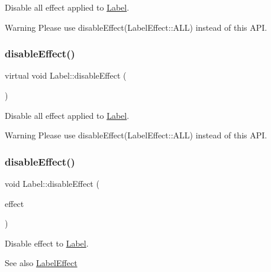Disable all effect applied to \hyperlink{classLabel}{Label}. \begin{DoxyWarning}{Warning}
Please use disable\+Effect(\+Label\+Effect\+::\+A\+L\+L) instead of this A\+PI. 
\end{DoxyWarning}
\mbox{\label{classLabel_a9991f8f752452ac697b1935d1be47c9f}} 
\subsubsection{\texorpdfstring{disable\+Effect()}{disableEffect()}\hspace{0.1cm}{\footnotesize\ttfamily [2/4]}}
{\footnotesize\ttfamily virtual void Label\+::disable\+Effect (\begin{DoxyParamCaption}{ }\end{DoxyParamCaption})\hspace{0.3cm}{\ttfamily [virtual]}}

Disable all effect applied to \hyperlink{classLabel}{Label}. \begin{DoxyWarning}{Warning}
Please use disable\+Effect(\+Label\+Effect\+::\+A\+L\+L) instead of this A\+PI. 
\end{DoxyWarning}
\mbox{\label{classLabel_a109588481f85c8cdd378d7adbb23edbe}} 
\subsubsection{\texorpdfstring{disable\+Effect()}{disableEffect()}\hspace{0.1cm}{\footnotesize\ttfamily [3/4]}}
{\footnotesize\ttfamily void Label\+::disable\+Effect (\begin{DoxyParamCaption}\item[{\hyperlink{group__base_ga26fd049ca5303e0cf4435208058f32e4}{Label\+Effect}}]{effect }\end{DoxyParamCaption})\hspace{0.3cm}{\ttfamily [virtual]}}

Disable effect to \hyperlink{classLabel}{Label}.

\begin{DoxySeeAlso}{See also}
{\ttfamily \hyperlink{group__base_ga26fd049ca5303e0cf4435208058f32e4}{Label\+Effect}} 
\end{DoxySeeAlso}
\mbox{\label{classLabel_a7c741a17efc7dfb0949a91ea00f03b7a}} 
